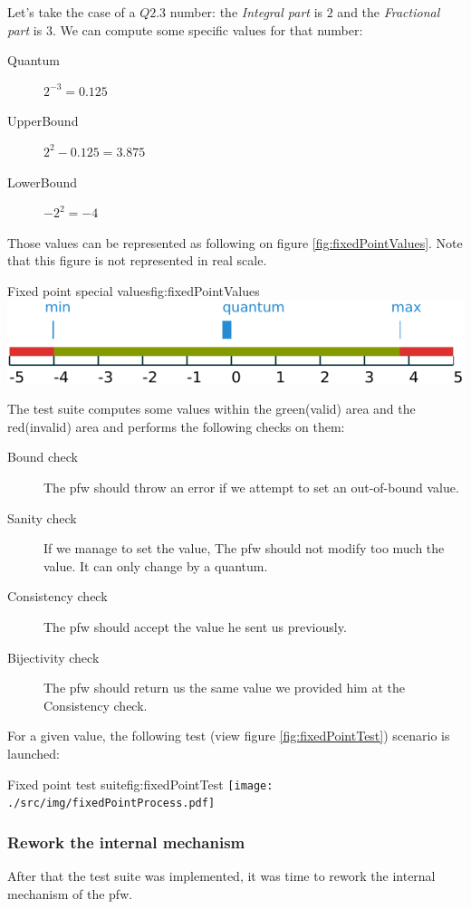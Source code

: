 Let's take the case of a $Q2.3$ number: the \emph{Integral part} is $2$ and the
\emph{Fractional part} is $3$. We can compute some specific values for that number:

\begin{description}
    \item[Quantum] $2^{-3} = 0.125$
    \item[UpperBound] $2^2 - 0.125 = 3.875$
    \item[LowerBound] $-2^2 = -4$
\end{description}

Those values can be represented as following on figure \ref{fig:fixedPointValues}. Note that
this figure is not represented in real scale.
\begin{figureGraphics}{Fixed point special values}{fig:fixedPointValues}
    \includegraphics[width=\textwidth]{./src/img/fixedPoint.pdf}
\end{figureGraphics}


The test suite computes some values within the green(valid) area and the
red(invalid) area and performs the following checks on them:
\begin{description}
    \item[Bound check] The \gls{pfw} should throw an error if we
        attempt to set an out-of-bound value.
    \item[Sanity check] If we manage to set the value, The \gls{pfw} should not modify too much
        the value. It can only change by a quantum.
    \item[Consistency check] The \gls{pfw} should accept the value he sent us previously.
    \item[Bijectivity check] The \gls{pfw} should return us the same value we provided him at the Consistency check.
\end{description}

For a given value, the following test (view figure \ref{fig:fixedPointTest}) scenario is launched:
\begin{figureGraphics}{Fixed point test suite}{fig:fixedPointTest}
    \texttt{[image: ./src/img/fixedPointProcess.pdf]}
\end{figureGraphics}

\subsubsection{Rework the internal mechanism}
After that the test suite was implemented, it was time to rework the internal
mechanism of the \gls{pfw}.

